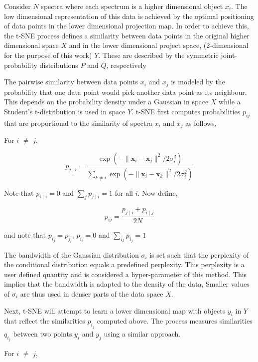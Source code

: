Consider $N$ spectra where each spectrum is a higher dimensional object $x_i$. The low dimensional representation of this data is achieved by the optimal positioning of data points in the lower dimensional projection map. In order to achieve this, the t-SNE process defines a similarity between data points in the original higher dimensional space $X$ and in the lower dimensional project space, (2-dimensional for the purpose of this work) $Y$. These are described by the symmetric joint-
probability distributions $P$ and $Q$, respectively

The pairwise similarity between data points $x_i$ and $x_j$ is modeled by the probability that one data point would pick another data point as its neighbour. This depends on the probability density under a Gaussian in space $X$ while a Student's t-distribution is used in space $Y$. t-SNE first computes probabilities $p_{ij}$ that are proportional to the similarity of spectra $x_i$ and $x_j$ as follows,


For $i$ $\neq$ $j$,

\begin{equation}
p_{j\mid i}={\frac {\exp(-\lVert \mathbf {x} _{i}-\mathbf {x} _{j}\rVert ^{2}/2\sigma _{i}^{2})}{\sum _{k\neq i}\exp(-\lVert \mathbf {x} _{i}-\mathbf {x} _{k}\rVert ^{2}/2\sigma _{i}^{2})}}
\end{equation}

Note that $p_{i\mid i}=0$ and $\sum _{j}p_{j\mid i}=1$ for all $i$. Now define,

\begin{equation}
    p_{ij}={\frac {p_{j\mid i}+p_{i\mid j}}{2N}}
\end{equation}

and note that $p_i_j=p_j_i$, $p_i_i=0$ and $\sum _{ij} p_i_j=1$

The bandwidth of the Gaussian distribution $\sigma_i$ is set such that the perplexity of the conditional distribution equals a predefined perplexity. This perplexity is a user defined quantity and is considered a hyper-parameter of this method. This implies that the bandwidth is adapted to the density of the data, Smaller values of $\sigma_i$ are thus used in denser parts of the data space $X$. 

Next, t-SNE will attempt to learn a lower dimensional map with objects $y_i$ in $Y$ that reflect the similarities $p_i_j$ computed above. The process measures similarities $q_i_j$ between two points $y_i$ and $y_j$ using a similar approach. 

For $i$ $\neq$ $j$,

